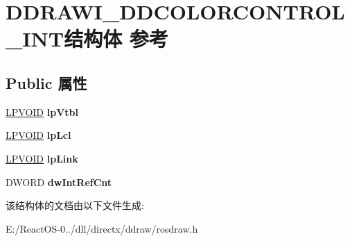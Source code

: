 \hypertarget{struct_d_d_r_a_w_i___d_d_c_o_l_o_r_c_o_n_t_r_o_l___i_n_t}{}\section{D\+D\+R\+A\+W\+I\+\_\+\+D\+D\+C\+O\+L\+O\+R\+C\+O\+N\+T\+R\+O\+L\+\_\+\+I\+N\+T结构体 参考}
\label{struct_d_d_r_a_w_i___d_d_c_o_l_o_r_c_o_n_t_r_o_l___i_n_t}
\subsection*{Public 属性}
\begin{DoxyCompactItemize}
\item 
\mbox{\label{struct_d_d_r_a_w_i___d_d_c_o_l_o_r_c_o_n_t_r_o_l___i_n_t_a3472f7386575793b83b0f191dc4f0d31}} 
\hyperlink{interfacevoid}{L\+P\+V\+O\+ID} {\bfseries lp\+Vtbl}
\item 
\mbox{\label{struct_d_d_r_a_w_i___d_d_c_o_l_o_r_c_o_n_t_r_o_l___i_n_t_a9d3239cd565a7894ed80de3df9c8e504}} 
\hyperlink{interfacevoid}{L\+P\+V\+O\+ID} {\bfseries lp\+Lcl}
\item 
\mbox{\label{struct_d_d_r_a_w_i___d_d_c_o_l_o_r_c_o_n_t_r_o_l___i_n_t_ad48a855b7d3914c0ffa5d35d288a9095}} 
\hyperlink{interfacevoid}{L\+P\+V\+O\+ID} {\bfseries lp\+Link}
\item 
\mbox{\label{struct_d_d_r_a_w_i___d_d_c_o_l_o_r_c_o_n_t_r_o_l___i_n_t_a63937bf93c20c3dbb25fe6b09591a7a8}} 
D\+W\+O\+RD {\bfseries dw\+Int\+Ref\+Cnt}
\end{DoxyCompactItemize}


该结构体的文档由以下文件生成\+:\begin{DoxyCompactItemize}
\item 
E\+:/\+React\+O\+S-\/0../dll/directx/ddraw/rosdraw.\+h\end{DoxyCompactItemize}
